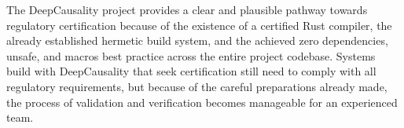 The DeepCausality project provides a clear and plausible pathway towards regulatory certification because of the existence of a certified Rust compiler, the already established hermetic build system, and the achieved zero dependencies, unsafe, and macros best practice across the entire project codebase. Systems build with DeepCausality that seek certification still need to comply with all regulatory requirements, but because of the careful preparations already made, the process of validation and verification becomes manageable for an experienced team.

\newpage
